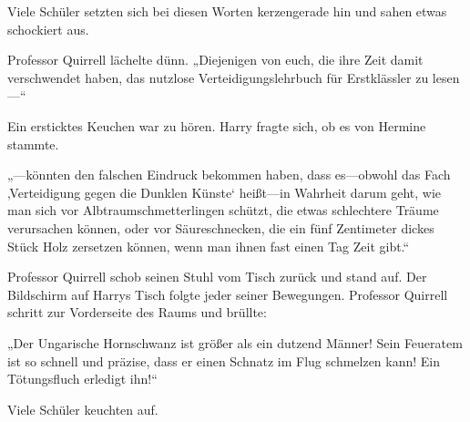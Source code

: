 Viele Schüler setzten sich bei diesen Worten kerzengerade hin und sahen etwas schockiert aus.

Professor Quirrell lächelte dünn. „Diejenigen von euch, die ihre Zeit damit verschwendet haben, das nutzlose Verteidigungslehrbuch für Erstklässler zu lesen—“

Ein ersticktes Keuchen war zu hören. Harry fragte sich, ob es von Hermine stammte.

„—könnten den falschen Eindruck bekommen haben, dass es—obwohl das Fach ‚Verteidigung gegen die Dunklen Künste‘ heißt—in Wahrheit darum geht, wie man sich vor Albtraumschmetterlingen schützt, die etwas schlechtere Träume verursachen können, oder vor Säureschnecken, die ein fünf Zentimeter dickes Stück Holz zersetzen können, wenn man ihnen fast einen Tag Zeit gibt.“

Professor Quirrell schob seinen Stuhl vom Tisch zurück und stand auf. Der Bildschirm auf Harrys Tisch folgte jeder seiner Bewegungen. Professor Quirrell schritt zur Vorderseite des Raums und brüllte:

„Der Ungarische Hornschwanz ist größer als ein dutzend Männer! Sein Feueratem ist so schnell und präzise, dass er einen Schnatz im Flug schmelzen kann! Ein Tötungsfluch erledigt ihn!“

Viele Schüler keuchten auf.

